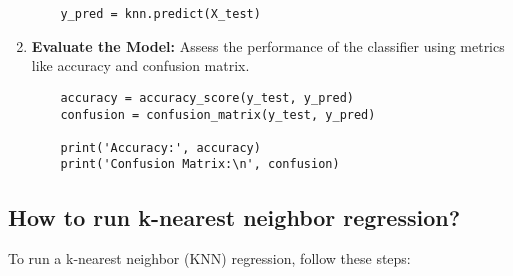 \begin{enumerate}
    \begin{verbatim}
    y_pred = knn.predict(X_test)
    \end{verbatim}

    \item \textbf{Evaluate the Model:}
    Assess the performance of the classifier using metrics like accuracy and confusion matrix.

    \begin{verbatim}
    accuracy = accuracy_score(y_test, y_pred)
    confusion = confusion_matrix(y_test, y_pred)

    print('Accuracy:', accuracy)
    print('Confusion Matrix:\n', confusion)
    \end{verbatim}
\end{enumerate}


\subsection{How to run k-nearest neighbor regression?}

To run a k-nearest neighbor (KNN) regression, follow these steps:

